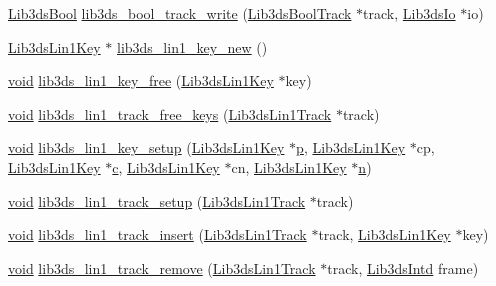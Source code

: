 \begin{DoxyCompactItemize}
\item 
\hyperlink{types_8h_a89dd7398a9ebbbf28011f8c32df67ad3}{Lib3ds\-Bool} \hyperlink{group__tracks_gab81f8794b9ebf91f9e787d9452206a40}{lib3ds\-\_\-bool\-\_\-track\-\_\-write} (\hyperlink{struct_lib3ds_bool_track}{Lib3ds\-Bool\-Track} $\ast$track, \hyperlink{struct_lib3ds_io}{Lib3ds\-Io} $\ast$io)
\item 
\hyperlink{struct_lib3ds_lin1_key}{Lib3ds\-Lin1\-Key} $\ast$ \hyperlink{group__tracks_ga3b0f0b04eeb07d3bec46604c25935242}{lib3ds\-\_\-lin1\-\_\-key\-\_\-new} ()
\item 
\hyperlink{group___u_a_v_objects_plugin_ga444cf2ff3f0ecbe028adce838d373f5c}{void} \hyperlink{group__tracks_gaed3e16edfd8384ec9aed95f532269541}{lib3ds\-\_\-lin1\-\_\-key\-\_\-free} (\hyperlink{struct_lib3ds_lin1_key}{Lib3ds\-Lin1\-Key} $\ast$key)
\item 
\hyperlink{group___u_a_v_objects_plugin_ga444cf2ff3f0ecbe028adce838d373f5c}{void} \hyperlink{group__tracks_ga838608e75c159704ad2f212e51aa4e9c}{lib3ds\-\_\-lin1\-\_\-track\-\_\-free\-\_\-keys} (\hyperlink{struct_lib3ds_lin1_track}{Lib3ds\-Lin1\-Track} $\ast$track)
\item 
\hyperlink{group___u_a_v_objects_plugin_ga444cf2ff3f0ecbe028adce838d373f5c}{void} \hyperlink{group__tracks_gab51367330c93daf2c9370544accd00d8}{lib3ds\-\_\-lin1\-\_\-key\-\_\-setup} (\hyperlink{struct_lib3ds_lin1_key}{Lib3ds\-Lin1\-Key} $\ast$\hyperlink{glext_8h_aa5367c14d90f462230c2611b81b41d23}{p}, \hyperlink{struct_lib3ds_lin1_key}{Lib3ds\-Lin1\-Key} $\ast$cp, \hyperlink{struct_lib3ds_lin1_key}{Lib3ds\-Lin1\-Key} $\ast$\hyperlink{glext_8h_a1f2d7f8147412c43ba2303a56f97ee73}{c}, \hyperlink{struct_lib3ds_lin1_key}{Lib3ds\-Lin1\-Key} $\ast$cn, \hyperlink{struct_lib3ds_lin1_key}{Lib3ds\-Lin1\-Key} $\ast$\hyperlink{glext_8h_a4eacae1d9e7c39f8236bb36d4ececa77}{n})
\item 
\hyperlink{group___u_a_v_objects_plugin_ga444cf2ff3f0ecbe028adce838d373f5c}{void} \hyperlink{group__tracks_gaf8bf2b0768e70a7f67251f46cece1ede}{lib3ds\-\_\-lin1\-\_\-track\-\_\-setup} (\hyperlink{struct_lib3ds_lin1_track}{Lib3ds\-Lin1\-Track} $\ast$track)
\item 
\hyperlink{group___u_a_v_objects_plugin_ga444cf2ff3f0ecbe028adce838d373f5c}{void} \hyperlink{group__tracks_gadc39dd7ac081df6cb7f5f45be370a533}{lib3ds\-\_\-lin1\-\_\-track\-\_\-insert} (\hyperlink{struct_lib3ds_lin1_track}{Lib3ds\-Lin1\-Track} $\ast$track, \hyperlink{struct_lib3ds_lin1_key}{Lib3ds\-Lin1\-Key} $\ast$key)
\item 
\hyperlink{group___u_a_v_objects_plugin_ga444cf2ff3f0ecbe028adce838d373f5c}{void} \hyperlink{group__tracks_ga4bd89481e70cc87bfb6e26603b98b796}{lib3ds\-\_\-lin1\-\_\-track\-\_\-remove} (\hyperlink{struct_lib3ds_lin1_track}{Lib3ds\-Lin1\-Track} $\ast$track, \hyperlink{types_8h_a5d92ad41149cf040ce2ee32cc2609403}{Lib3ds\-Intd} frame)

\end{DoxyCompactItemize}

